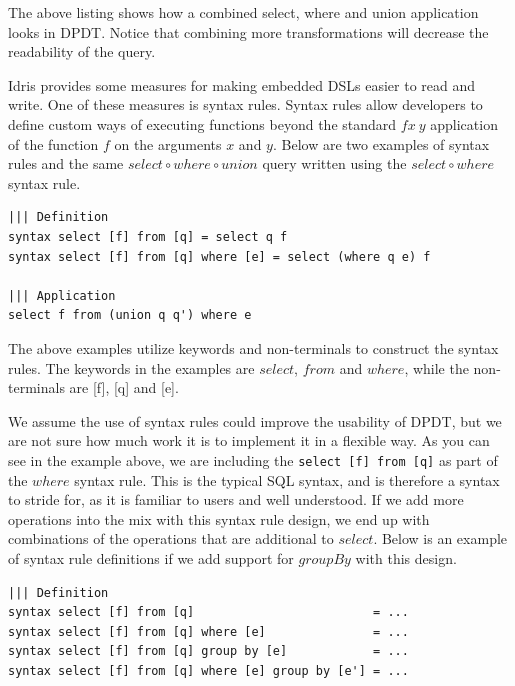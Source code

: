 \documentclass[12pt]{article}
\begin{document}
The above listing shows how a combined select, where and union application looks in DPDT.
Notice that combining more transformations will decrease the readability of the query.

Idris provides some measures for making embedded DSLs easier to read and write.
One of these measures is syntax rules.
Syntax rules allow developers to define custom ways of executing functions beyond the standard $f x \: y$ application of the function $f$ on the arguments $x$ and $y$.
Below are two examples of syntax rules and the same $select \circ where \circ union$ query written using the $select \circ where$ syntax rule.

\begin{lstlisting}
||| Definition
syntax select [f] from [q] = select q f
syntax select [f] from [q] where [e] = select (where q e) f

||| Application
select f from (union q q') where e
\end{lstlisting}

The above examples utilize keywords and non-terminals to construct the syntax rules.
The keywords in the examples are $select$, $from$ and $where$, while the non-terminals are [f], [q] and [e].

We assume the use of syntax rules could improve the usability of DPDT, but we are not sure how much work it is to implement it in a flexible way. 
As you can see in the example above, we are including the \texttt{select [f] from [q]} as part of the $where$ syntax rule.
This is the typical SQL syntax, and is therefore a syntax to stride for, as it is familiar to users and well understood.
If we add more operations into the mix with this syntax rule design, we end up with combinations of the operations that are additional to $select$.
Below is an example of syntax rule definitions if we add support for $groupBy$ with this design.

\begin{lstlisting}
||| Definition
syntax select [f] from [q]                         = ...
syntax select [f] from [q] where [e]               = ...
syntax select [f] from [q] group by [e]            = ...
syntax select [f] from [q] where [e] group by [e'] = ...
\end{lstlisting}




\end{document}
